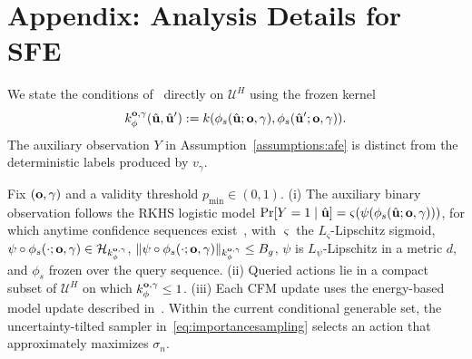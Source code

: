 \section{Appendix: Analysis Details for SFE}
\label{app:sfe-analysis}
We state the conditions of~\cite[Thm.~F.5]{de2026active} directly on $\mathcal U^H$ using the frozen kernel
\begin{equation}
k_{\phi}^{\mathbf{o},\gamma}(\hat{\mathbf u},\hat{\mathbf u}')
:=k(\phi_s(\hat{\mathbf u};\mathbf{o},\gamma),\phi_s(\hat{\mathbf u}';\mathbf{o},\gamma)).
\end{equation}
The auxiliary observation $Y$ in Assumption~\ref{assumptions:afe} is distinct from the deterministic labels produced by $v_\gamma$.
\begin{assumption}
\label{assumptions:afe}
Fix $(\mathbf{o},\gamma)$ and a validity threshold $p_{\min}\in(0,1)$.
(i) The auxiliary binary observation follows the RKHS logistic model $\Pr[Y=1\mid\hat{\mathbf u}]=\varsigma(\psi(\phi_s(\hat{\mathbf u};\mathbf{o},\gamma)))$, for which anytime confidence sequences exist~\cite{pasztor2024bandits}, with $\varsigma$ the $L_\varsigma$-Lipschitz sigmoid, $\psi\circ\phi_s(\cdot;\mathbf{o},\gamma)\in\mathcal H_{k_\phi^{\mathbf{o},\gamma}}$, $\|\psi\circ\phi_s(\cdot;\mathbf{o},\gamma)\|_{k_\phi^{\mathbf{o},\gamma}}\le B_g$, $\psi$ is $L_\psi$-Lipschitz in a metric $d$, and $\phi_s$ frozen over the query sequence.
(ii) Queried actions lie in a compact subset of $\mathcal U^H$ on which
$k_\phi^{\mathbf{o},\gamma}\le1$.
(iii) Each CFM update uses the energy-based model update described
in~\cite{de2026active}. Within the current conditional generable set, the uncertainty-tilted sampler in~\eqref{eq:importancesampling} selects an action that approximately maximizes $\sigma_n$.
\end{assumption}

